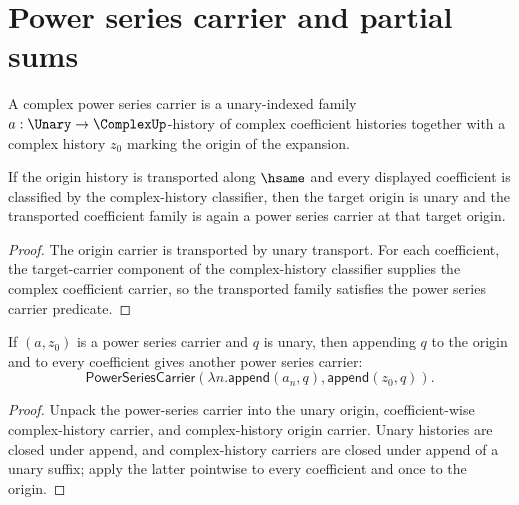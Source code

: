 
\section{Power series carrier and partial sums}

\begin{definition}
\label{def:power-series-carrier}
A complex power series carrier is a unary-indexed family \(a : \Unary \to \ComplexUp\)-history of complex coefficient histories together with a complex history \(z_0\) marking the origin of the expansion.
\end{definition}

\begin{lemma}
\label{lem:power-series-carrier-origin-coefficient-transport}
If the origin history is transported along $\hsame$ and every displayed
coefficient is classified by the complex-history classifier, then the target
origin is unary and the transported coefficient family is again a power series
carrier at that target origin.
\end{lemma}
\begin{proof}
The origin carrier is transported by unary transport. For each coefficient,
the target-carrier component of the complex-history classifier supplies the
complex coefficient carrier, so the transported family satisfies the power
series carrier predicate.
\end{proof}

\begin{lemma}
\label{thm:power-series-carrier-append-unary-closed}
If $(a,z_0)$ is a power series carrier and $q$ is unary, then appending $q$ to
the origin and to every coefficient gives another power series carrier:
$$
\mathsf{PowerSeriesCarrier}(\lambda n.\mathsf{append}(a_n,q),\mathsf{append}(z_0,q)).
$$
\end{lemma}
\begin{proof}
Unpack the power-series carrier into the unary origin, coefficient-wise
complex-history carrier, and complex-history origin carrier. Unary histories
are closed under append, and complex-history carriers are closed under append
of a unary suffix; apply the latter pointwise to every coefficient and once to
the origin.
\end{proof}

